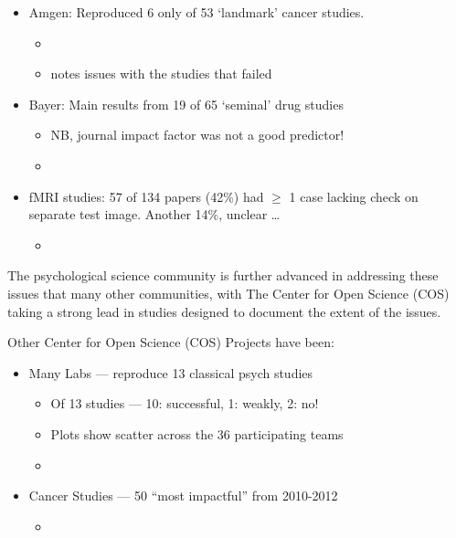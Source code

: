 \documentclass[
  10pt,
  b5paper]{book}
\providecommand{\tightlist}{%
  \setlength{\itemsep}{0pt}\setlength{\parskip}{0pt}}
\begin{document}
\begin{itemize}
\tightlist
\item
  Amgen: Reproduced 6 only of 53 `landmark' cancer studies.

  \begin{itemize}
  \tightlist
  \item
    \citet{r23_begley_ellis_2012}
  \item
    \citet{r2_begley_2013} notes issues with the studies that failed
  \end{itemize}
\item
  Bayer: Main results from 19 of 65 `seminal' drug studies

  \begin{itemize}
  \tightlist
  \item
    NB, journal impact factor was not a good predictor!
  \item
    \citet{r9_prinz_schlange_asadullah_2011}
  \end{itemize}
\item
  fMRI studies: 57 of 134 papers (42\%) had \(\geq\) 1 case lacking
  check on separate test image.
  Another 14\%, unclear \ldots{}

  \begin{itemize}
  \tightlist
  \item
    \citet{r8_kriegeskorte_simmons_bellgowan_baker_2009}
  \end{itemize}
\end{itemize}

The psychological science community is further advanced in
addressing these issues that many other communities, with
The Center for Open Science (COS) taking a strong lead in
studies designed to document the extent of the issues.

Other Center for Open Science (COS) Projects have been:

\begin{itemize}
\tightlist
\item
  Many Labs --- reproduce 13 classical psych studies

  \begin{itemize}
  \tightlist
  \item
    Of 13 studies --- 10: successful, 1: weakly, 2: no!
  \item
    Plots show scatter across the 36 participating teams
  \item
    \citet{r7_klein_others_2014}
  \end{itemize}
\item
  Cancer Studies --- 50 ``most impactful'' from 2010-2012

  \begin{itemize}
  \tightlist
  \item
    \citet{r5_kaiser_2015}
  \end{itemize}
\end{itemize}
\end{document}
